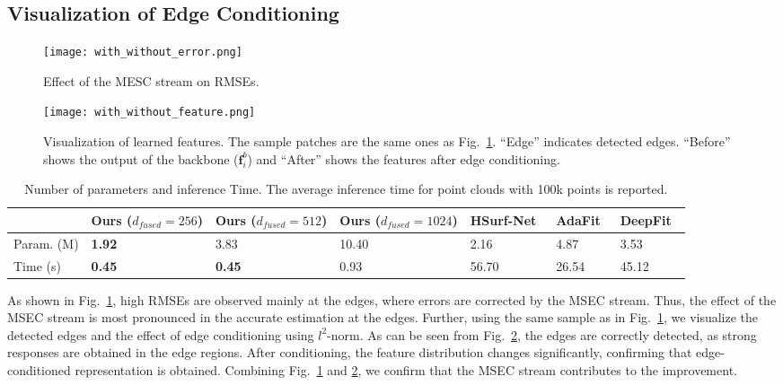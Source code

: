 \documentclass[sigconf]{acmart}
\begin{document}
\subsection{Visualization of Edge Conditioning}\label{sec: effect of edge conditioning}
\begin{figure}[t]
    \centering
    \texttt{[image: with\_without\_error.png]}
    \caption{Effect of the MESC stream on RMSEs.}
    \label{fig: with without error}
\end{figure}
\begin{figure}[t]
    \centering
    \texttt{[image: with\_without\_feature.png]}
    \caption{Visualization of learned features. The sample patches are the same ones as Fig.~\ref{fig: with without error}. ``Edge'' indicates detected edges. ``Before'' shows the output of the backbone ($\textbf{f}_i^b$) and ``After'' shows the features after edge conditioning.}
    \label{fig: with without feature}
\end{figure}
\begin{table*}[tb]
\small
\caption{Number of parameters and inference Time. The average inference time for point clouds with 100k points is reported.  }
\begin{tabular}{@{}lllllll@{}}
\toprule
              & Ours ($d_{fused}=256$) & Ours ($d_{fused}=512$) & Ours ($d_{fused}=1024$) & HSurf-Net~\cite{li2022hsurf} & AdaFit~\cite{zhu2021adafit} & DeepFit~\cite{ben2020deepfit} \\ \midrule
Param. (M) & \textbf{1.92} & 3.83 & 10.40 & 2.16      & 4.87   & 3.53    \\
Time (s)   & \textbf{0.45} & \textbf{0.45} & 0.93 & 56.70     & 26.54         & 45.12         \\ \bottomrule
\end{tabular}
\label{tab: efficiency}
\end{table*}
As shown in Fig.~\ref{fig: with without error}, high RMSEs are observed mainly at the edges, where errors are corrected by the MSEC stream. Thus, the effect of the MSEC stream is most pronounced in the accurate estimation at the edges.
Further, using the same sample as in Fig.~\ref{fig: with without error}, we visualize the detected edges and the effect of edge conditioning using $l^2$-norm. As can be seen from Fig.~\ref{fig: with without feature}, the edges are correctly detected, as strong responses are obtained in the edge regions. After conditioning, the feature distribution changes significantly, confirming that edge-conditioned representation is obtained. Combining Fig.~\ref{fig: with without error} and \ref{fig: with without feature}, we confirm that the MSEC stream contributes to the improvement.
\end{document}
